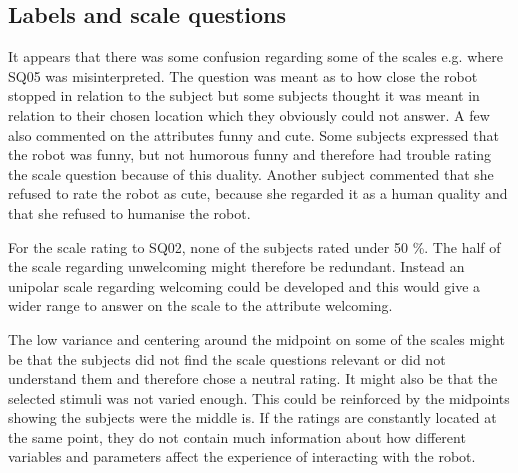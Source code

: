 \subsection{Labels and scale questions}
%
It appears that there was some confusion regarding some of the scales e.g. where SQ05 was misinterpreted. The question was meant as to how close the robot stopped in relation to the subject but some subjects thought it was meant in relation to their chosen location which they obviously could not answer. A few also commented on the attributes funny and cute. Some subjects expressed that the robot was funny, but not humorous funny and therefore had trouble rating the scale question because of this duality. Another subject commented that she refused to rate the robot as cute, because she regarded it as a human quality and that she refused to humanise the robot.

For the scale rating to SQ02, none of the subjects rated under 50 \%. The half of the scale regarding unwelcoming might therefore be redundant. Instead an unipolar scale regarding welcoming could be developed and this would give a wider range to answer on the scale to the attribute welcoming.

The low variance and centering around the midpoint on some of the scales might be that the subjects did not find the scale questions relevant or did not understand them and therefore chose a neutral rating. It might also be that the selected stimuli was not varied enough. This could be reinforced by the midpoints showing the subjects were the middle is. If the ratings are constantly located at the same point, they do not contain much information about how different variables and parameters affect the experience of interacting with the robot.